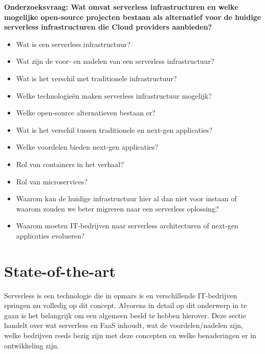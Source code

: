 \textbf{Onderzoeksvraag: 
    Wat omvat serverless infrastructuren en welke mogelijke open-source projecten bestaan als alternatief voor de huidige serverless infrastructuren die Cloud providers aanbieden?}
\begin{itemize}
  \item Wat is een serverless infrastructuur?
  \item Wat zijn de voor- en nadelen van een serverless infrastructuur?
  \item Wat is het verschil met traditionele infrastructuur?
  \item Welke technologieën maken serverless infrastructuur mogelijk?
  \item Welke open-source alternatieven bestaan er?
  \item Wat is het verschil tussen traditionele en next-gen applicaties?
  \item Welke voordelen bieden next-gen applicaties?
  \item Rol van containers in het verhaal?
  \item Rol van microservices?
  \item Waarom kan de huidige infrastructuur hier al dan niet voor instaan of waarom zouden we beter migreren naar een serverless oplossing?
  \item Waarom moeten IT-bedrijven naar serverless architecturen of next-gen applicaties evolueren?
\end{itemize}


\section{State-of-the-art}
\label{sec:state-of-the-art}

Serverless is een technologie die in opmars is en verschillende IT-bedrijven springen nu volledig op dit concept. Alvorens in detail op dit onderwerp in te gaan is het belangrijk om een algemeen beeld te hebben hierover. Deze sectie handelt over wat serverless en FaaS inhoudt, wat de voordelen/nadelen zijn, welke bedrijven reeds bezig zijn met deze concepten en welke benaderingen er in ontwikkeling zijn.

